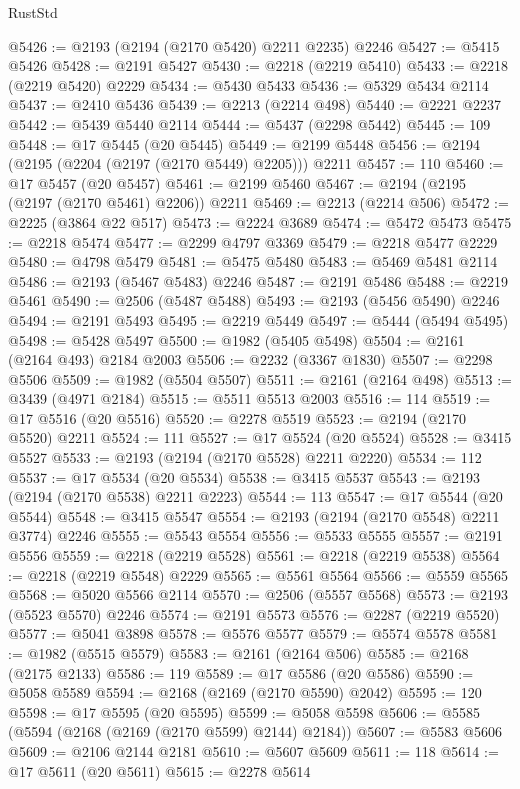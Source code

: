 \begin{lexlean}{RustStd}
\begin{coremodule}
@5426 := @2193 (@2194 (@2170 @5420) @2211 @2235) @2246
@5427 := @5415 @5426
@5428 := @2191 @5427
@5430 := @2218 (@2219 @5410)
@5433 := @2218 (@2219 @5420) @2229
@5434 := @5430 @5433
@5436 := @5329 @5434 @2114
@5437 := @2410 @5436
@5439 := @2213 (@2214 @498)
@5440 := @2221 @2237
@5442 := @5439 @5440 @2114
@5444 := @5437 (@2298 @5442)
@5445 := 109
@5448 := @17 @5445 (@20 @5445)
@5449 := @2199 @5448
@5456 := @2194 (@2195 (@2204 (@2197 (@2170 @5449) @2205))) @2211
@5457 := 110
@5460 := @17 @5457 (@20 @5457)
@5461 := @2199 @5460
@5467 := @2194 (@2195 (@2197 (@2170 @5461) @2206)) @2211
@5469 := @2213 (@2214 @506)
@5472 := @2225 (@3864 @22 @517)
@5473 := @2224 @3689
@5474 := @5472 @5473
@5475 := @2218 @5474
@5477 := @2299 @4797 @3369
@5479 := @2218 @5477 @2229
@5480 := @4798 @5479
@5481 := @5475 @5480
@5483 := @5469 @5481 @2114
@5486 := @2193 (@5467 @5483) @2246
@5487 := @2191 @5486
@5488 := @2219 @5461
@5490 := @2506 (@5487 @5488)
@5493 := @2193 (@5456 @5490) @2246
@5494 := @2191 @5493
@5495 := @2219 @5449
@5497 := @5444 (@5494 @5495)
@5498 := @5428 @5497
@5500 := @1982 (@5405 @5498)
@5504 := @2161 (@2164 @493) @2184 @2003
@5506 := @2232 (@3367 @1830)
@5507 := @2298 @5506
@5509 := @1982 (@5504 @5507)
@5511 := @2161 (@2164 @498)
@5513 := @3439 (@4971 @2184)
@5515 := @5511 @5513 @2003
@5516 := 114
@5519 := @17 @5516 (@20 @5516)
@5520 := @2278 @5519
@5523 := @2194 (@2170 @5520) @2211
@5524 := 111
@5527 := @17 @5524 (@20 @5524)
@5528 := @3415 @5527
@5533 := @2193 (@2194 (@2170 @5528) @2211 @2220)
@5534 := 112
@5537 := @17 @5534 (@20 @5534)
@5538 := @3415 @5537
@5543 := @2193 (@2194 (@2170 @5538) @2211 @2223)
@5544 := 113
@5547 := @17 @5544 (@20 @5544)
@5548 := @3415 @5547
@5554 := @2193 (@2194 (@2170 @5548) @2211 @3774) @2246
@5555 := @5543 @5554
@5556 := @5533 @5555
@5557 := @2191 @5556
@5559 := @2218 (@2219 @5528)
@5561 := @2218 (@2219 @5538)
@5564 := @2218 (@2219 @5548) @2229
@5565 := @5561 @5564
@5566 := @5559 @5565
@5568 := @5020 @5566 @2114
@5570 := @2506 (@5557 @5568)
@5573 := @2193 (@5523 @5570) @2246
@5574 := @2191 @5573
@5576 := @2287 (@2219 @5520)
@5577 := @5041 @3898
@5578 := @5576 @5577
@5579 := @5574 @5578
@5581 := @1982 (@5515 @5579)
@5583 := @2161 (@2164 @506)
@5585 := @2168 (@2175 @2133)
@5586 := 119
@5589 := @17 @5586 (@20 @5586)
@5590 := @5058 @5589
@5594 := @2168 (@2169 (@2170 @5590) @2042)
@5595 := 120
@5598 := @17 @5595 (@20 @5595)
@5599 := @5058 @5598
@5606 := @5585 (@5594 (@2168 (@2169 (@2170 @5599) @2144) @2184))
@5607 := @5583 @5606
@5609 := @2106 @2144 @2181
@5610 := @5607 @5609
@5611 := 118
@5614 := @17 @5611 (@20 @5611)
@5615 := @2278 @5614

\end{coremodule}
\end{lexlean}
